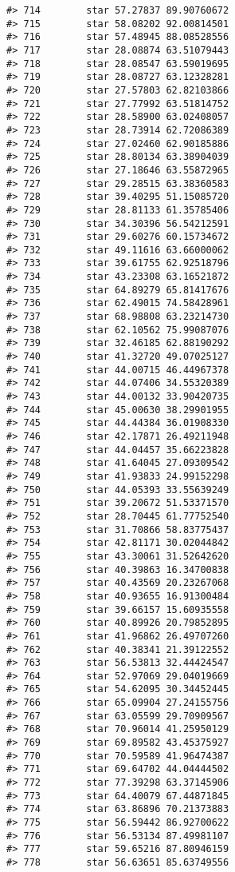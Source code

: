 \documentclass[
]{book}
\theoremstyle{definition}
\theoremstyle{definition}
\theoremstyle{definition}
\theoremstyle{definition}
\theoremstyle{remark}
\begin{document}
\begin{verbatim}
#> 714        star 57.27837 89.90760672
#> 715        star 58.08202 92.00814501
#> 716        star 57.48945 88.08528556
#> 717        star 28.08874 63.51079443
#> 718        star 28.08547 63.59019695
#> 719        star 28.08727 63.12328281
#> 720        star 27.57803 62.82103866
#> 721        star 27.77992 63.51814752
#> 722        star 28.58900 63.02408057
#> 723        star 28.73914 62.72086389
#> 724        star 27.02460 62.90185886
#> 725        star 28.80134 63.38904039
#> 726        star 27.18646 63.55872965
#> 727        star 29.28515 63.38360583
#> 728        star 39.40295 51.15085720
#> 729        star 28.81133 61.35785406
#> 730        star 34.30396 56.54212591
#> 731        star 29.60276 60.15734672
#> 732        star 49.11616 63.66000062
#> 733        star 39.61755 62.92518796
#> 734        star 43.23308 63.16521872
#> 735        star 64.89279 65.81417676
#> 736        star 62.49015 74.58428961
#> 737        star 68.98808 63.23214730
#> 738        star 62.10562 75.99087076
#> 739        star 32.46185 62.88190292
#> 740        star 41.32720 49.07025127
#> 741        star 44.00715 46.44967378
#> 742        star 44.07406 34.55320389
#> 743        star 44.00132 33.90420735
#> 744        star 45.00630 38.29901955
#> 745        star 44.44384 36.01908330
#> 746        star 42.17871 26.49211948
#> 747        star 44.04457 35.66223828
#> 748        star 41.64045 27.09309542
#> 749        star 41.93833 24.99152298
#> 750        star 44.05393 33.55639249
#> 751        star 39.20672 51.53371570
#> 752        star 28.70445 61.77752540
#> 753        star 31.70866 58.83775437
#> 754        star 42.81171 30.02044842
#> 755        star 43.30061 31.52642620
#> 756        star 40.39863 16.34700838
#> 757        star 40.43569 20.23267068
#> 758        star 40.93655 16.91300484
#> 759        star 39.66157 15.60935558
#> 760        star 40.89926 20.79852895
#> 761        star 41.96862 26.49707260
#> 762        star 40.38341 21.39122552
#> 763        star 56.53813 32.44424547
#> 764        star 52.97069 29.04019669
#> 765        star 54.62095 30.34452445
#> 766        star 65.09904 27.24155756
#> 767        star 63.05599 29.70909567
#> 768        star 70.96014 41.25950129
#> 769        star 69.89582 43.45375927
#> 770        star 70.59589 41.96474387
#> 771        star 69.64702 44.04444502
#> 772        star 77.39298 63.37145906
#> 773        star 64.40079 67.44871845
#> 774        star 63.86896 70.21373883
#> 775        star 56.59442 86.92700622
#> 776        star 56.53134 87.49981107
#> 777        star 59.65216 87.80946159
#> 778        star 56.63651 85.63749556

\end{verbatim}
\end{document}
